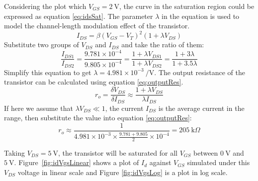 \documentclass[12pt]{article}   %
\begin{document}
	Considering the plot which $V_{GS} = \SI{2}{\volt}$, the curve in the saturation region could be expressed as equation \eqref{eq:idsSat}. The parameter $\lambda$ in the equation is used to model the channel-length modulation effect of the transistor.
	\begin{equation}
		I_{DS} = \beta \left(V_{GS} - V_{T}\right)^2 \left(1 + \lambda V_{DS}\right)
		\label{eq:idsSat}
	\end{equation}
	Substitute two groups of $V_{DS}$ and $I_{DS}$ and take the ratio of them:
	\begin{equation}
		\frac{I_{DS1}}{I_{DS2}} = \frac{9.781 \times 10^{-4}}{9.805 \times 10^{-4}} = \frac{1 + \lambda V_{DS1}}{1 + \lambda V_{DS2}} = \frac{1 + 3\lambda}{1 + 3.5\lambda}
	\end{equation}
	Simplify this equation to get $\lambda = 4.981 \times 10^{-3}\ \si{\per\volt}$. The output resistance of the transistor can be calculated using equation \eqref{eq:outputRes}. 
	\begin{equation}
		r_o = \frac{\delta V_{DS}}{\delta I_{DS}} \approx \frac{1 + \lambda V_{DS}}{\lambda I_{DS}}
		\label{eq:outputRes}
	\end{equation}
	If here we assume that $\lambda V_{DS} \ll 1$, the current $I_{DS}$ is the average current in the range, then substitute the value into equation \eqref{eq:outputRes}:
	\begin{equation}
		r_o \approx \frac{1}{4.981 \times 10^{-3} \times \frac{9.781 + 9.805}{2} \times 10^{-4}} = \SI{205}{\kilo\Omega}
		\label{eq:outputResistance}
	\end{equation}
	
	Taking $V_{DS} = \SI{5}{\volt}$, the transistor will be saturated for all $V_{GS}$ between $\SI{0}{\volt}$ and $\SI{5}{\volt}$. Figure~\ref{fig:idVgsLinear} shows a plot of $I_{d}$ against $V_{GS}$ simulated under this $V_{DS}$ voltage in linear scale and Figure \ref{fig:idVgsLog} is a plot in log scale.
	
\end{document}
